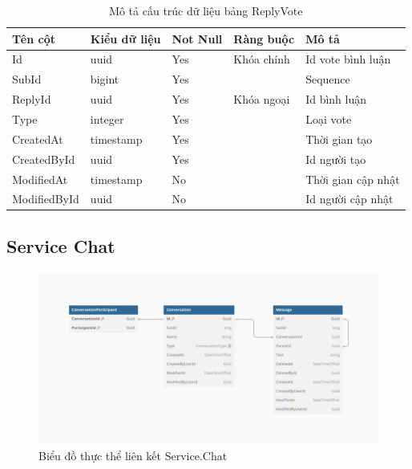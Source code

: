 \documentclass[../index.tex]{subfiles}
\begin{document}
    \begin{table}[H]
        \begin{tabular}{ |p{3cm}|p{2.5cm}|p{1.6cm}|p{2.2cm}|p{3cm}| }
            \hline
            Tên cột      & Kiểu dữ liệu             & Not Null & Ràng buộc  & Mô tả              \\
            \hline
            Id           & uuid                     & Yes      & Khóa chính & Id vote bình luận  \\
            \hline
            SubId        & bigint                   & Yes      &            & Sequence           \\
            \hline
            ReplyId      & uuid                     & Yes      & Khóa ngoại & Id bình luận       \\
            \hline
            Type         & integer                  & Yes      &            & Loại vote          \\
            \hline
            CreatedAt    & timestamp & Yes      &            & Thời gian tạo      \\
            \hline
            CreatedById  & uuid                     & Yes      &            & Id người tạo       \\
            \hline
            ModifiedAt   & timestamp & No       &            & Thời gian cập nhật \\
            \hline
            ModifiedById & uuid                     & No       &            & Id người cập nhật  \\
            \hline
        \end{tabular}
        \caption{Mô tả cấu trúc dữ liệu bảng ReplyVote}
    \end{table}

    \subsection{Service Chat}
    \begin{figure}[H]
        \centering
        \includegraphics[width=0.85\linewidth]{../figures/service-chat_erd.png}
        \caption{Biểu đồ thực thể liên kết Service.Chat}
        \label{fig:service-chat-erd}
    \end{figure}
\end{document}

